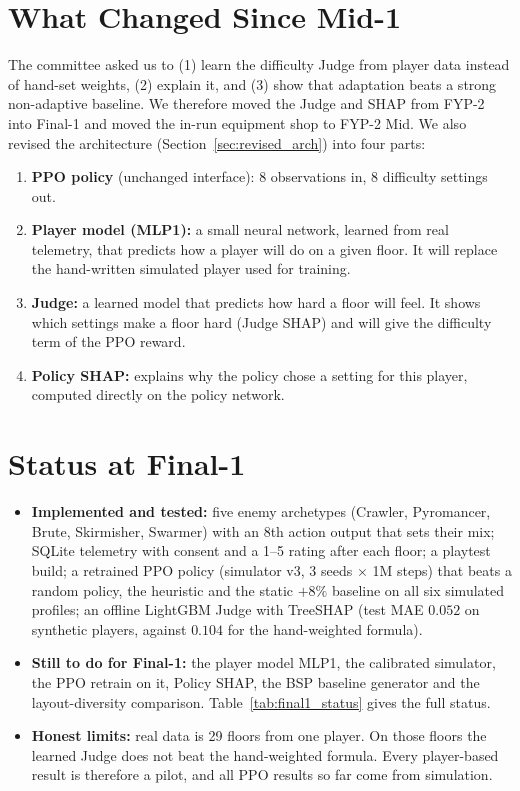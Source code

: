 \section*{What Changed Since Mid-1}
The committee asked us to (1) learn the difficulty Judge from player data instead of hand-set weights, (2) explain it, and (3) show that adaptation beats a strong non-adaptive baseline. We therefore moved the Judge and SHAP from FYP-2 into Final-1 and moved the in-run equipment shop to FYP-2 Mid. We also revised the architecture (Section~\ref{sec:revised_arch}) into four parts:
\begin{enumerate}
    \item \textbf{PPO policy} (unchanged interface): 8 observations in, 8 difficulty settings out.
    \item \textbf{Player model (MLP1):} a small neural network, learned from real telemetry, that predicts how a player will do on a given floor. It will replace the hand-written simulated player used for training.
    \item \textbf{Judge:} a learned model that predicts how hard a floor will feel. It shows which settings make a floor hard (Judge SHAP) and will give the difficulty term of the PPO reward.
    \item \textbf{Policy SHAP:} explains why the policy chose a setting for this player, computed directly on the policy network.
\end{enumerate}

\section*{Status at Final-1}
\begin{itemize}
    \item \textbf{Implemented and tested:} five enemy archetypes (Crawler, Pyromancer, Brute, Skirmisher, Swarmer) with an 8th action output that sets their mix; SQLite telemetry with consent and a 1--5 rating after each floor; a playtest build; a retrained PPO policy (simulator v3, 3 seeds $\times$ 1M steps) that beats a random policy, the heuristic and the static $+8\%$ baseline on all six simulated profiles; an offline LightGBM Judge with TreeSHAP (test MAE $0.052$ on synthetic players, against $0.104$ for the hand-weighted formula).
    \item \textbf{Still to do for Final-1:} the player model MLP1, the calibrated simulator, the PPO retrain on it, Policy SHAP, the BSP baseline generator and the layout-diversity comparison. Table~\ref{tab:final1_status} gives the full status.
    \item \textbf{Honest limits:} real data is 29 floors from one player. On those floors the learned Judge does not beat the hand-weighted formula. Every player-based result is therefore a pilot, and all PPO results so far come from simulation.
\end{itemize}

